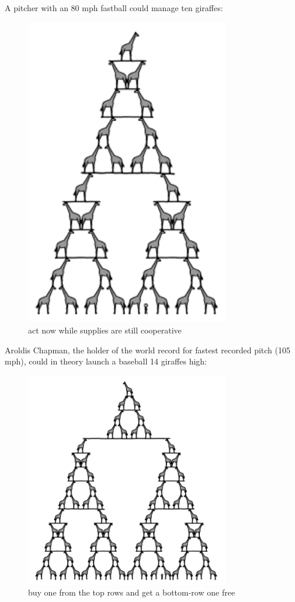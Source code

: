 {{A pitcher with an 80 mph fastball could manage ten giraffes:}

\begin{figure}[!htbp]
\centering
\includegraphics[scale=0.5, max width=0.8\textwidth]{imgs/a/44/high_throw_10.png}
\caption{act now while supplies are still cooperative}
\end{figure}

{Aroldis Chapman, the holder of the world record for fastest recorded pitch (105 mph), could in theory launch a baseball 14 giraffes high:}

\begin{figure}[!htbp]
\centering
\includegraphics[scale=0.5, max width=0.8\textwidth]{imgs/a/44/high_throw_14.png}
\caption{buy one from the top rows and get a bottom-row one free}
\end{figure}

}
